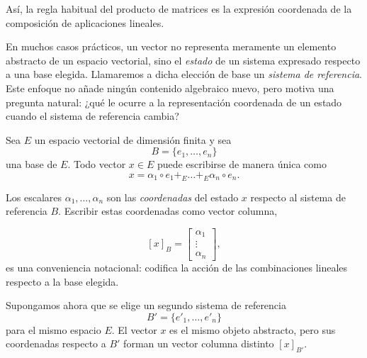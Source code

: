 Así, la regla habitual del producto de matrices es la expresión coordenada de la composición de aplicaciones lineales.

\medskip


En muchos casos prácticos, un vector no representa meramente un elemento abstracto de un
espacio vectorial, sino el \emph{estado} de un sistema expresado respecto a una base elegida.
Llamaremos a dicha elección de base un \emph{sistema de referencia}.
Este enfoque no añade ningún contenido algebraico nuevo, pero motiva una pregunta natural:
¿qué le ocurre a la representación coordenada de un estado cuando el sistema de referencia cambia?

\medskip


Sea $E$ un espacio vectorial de dimensión finita y sea
\[
B=\{e_1,\dots,e_n\}
\]
una base de $E$. Todo vector $x\in E$ puede escribirse de manera única como
\[
x = \alpha_1 \circ e_1 +_E \dots +_E \alpha_n \circ e_n.
\]

Los escalares $\alpha_1,\dots,\alpha_n$ son las \emph{coordenadas} del estado $x$ respecto al sistema de referencia $B$. Escribir estas coordenadas como vector columna,

\[
[x]_B =
\begin{bmatrix}
\alpha_1\\
\vdots\\
\alpha_n
\end{bmatrix},
\]
es una conveniencia notacional: codifica la acción de las combinaciones lineales respecto a la base elegida.

\medskip

Supongamos ahora que se elige un segundo sistema de referencia
\[
B'=\{e'_1,\dots,e'_n\}
\]
para el mismo espacio $E$. El vector $x$ es el mismo objeto abstracto, pero sus coordenadas respecto a $B'$ forman un vector columna distinto $[x]_{B'}$.

\medskip

